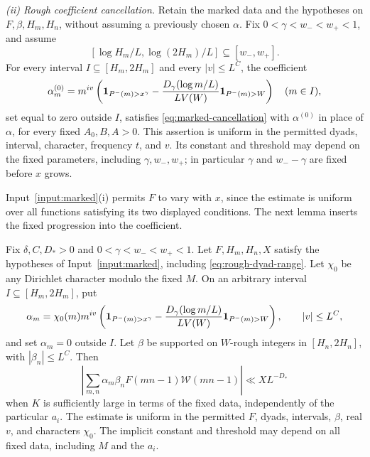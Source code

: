 \begin{hypothesis}
\emph{(ii) Rough coefficient cancellation.}
Retain the marked data and the hypotheses on \(F,\beta,H_m,H_n\), without
assuming a previously chosen \(\alpha\).  Fix \(0<\gamma<w_-<w_+<1\), and assume
\begin{equation}\label{eq:rough-dyad-range}
 [\log H_m/L,\log(2H_m)/L]\subseteq[w_-,w_+].
\end{equation}
For every interval \(I\subseteq[H_m,2H_m]\) and every \(|v|\le L^C\),
the coefficient
\begin{equation}\label{eq:untwisted-rough-coefficient}
 \alpha_m^{(0)}=m^{iv}\left(
   \mathbf 1_{P^-(m)>x^\gamma}
   -\frac{D_\gamma(\log m/L)}{LV(W)}\mathbf 1_{P^-(m)>W}\right)
 \quad(m\in I),
\end{equation}
set equal to zero outside \(I\), satisfies
\eqref{eq:marked-cancellation} with \(\alpha^{(0)}\) in place of
\(\alpha\), for every fixed \(A_0,B,A>0\).  This assertion is uniform in
the permitted dyads, interval, character, frequency \(t\), and \(v\).
Its constant and threshold may depend on the fixed parameters, including
\(\gamma,w_-,w_+\); in particular \(\gamma\) and \(w_--\gamma\) are
fixed before \(x\) grows.
\end{hypothesis}

Input~\ref{input:marked}(i) permits \(F\) to vary with \(x\), since the estimate is
uniform over all functions satisfying its two displayed conditions.
The next lemma inserts the fixed progression into the coefficient.

\begin{lemma}
\label{lem:twisted-rough-type-ii}
Fix \(\delta,C,D_*>0\) and \(0<\gamma<w_-<w_+<1\).  Let \(F,H_m,H_n,X\)
satisfy the hypotheses of Input~\ref{input:marked}, including
\eqref{eq:rough-dyad-range}.  Let \(\chi_0\) be any Dirichlet character
modulo the fixed \(M\).  On an arbitrary interval
\(I\subseteq[H_m,2H_m]\), put
\begin{equation}\label{eq:twisted-rough-coefficient}
 \alpha_m=\chi_0(m)m^{iv}\left(
   \mathbf 1_{P^-(m)>x^\gamma}
   -\frac{D_\gamma(\log m/L)}{LV(W)}\mathbf 1_{P^-(m)>W}\right),
 \qquad |v|\le L^C,
\end{equation}
and set \(\alpha_m=0\) outside \(I\).  Let \(\beta\) be supported on
\(W\)-rough integers in \([H_n,2H_n]\), with \(|\beta_n|\le L^C\).  Then
\begin{equation}\label{eq:twisted-rough-type-ii}
 \left|\sum_{m,n}\alpha_m\beta_nF(mn-1)\mathcal W(mn-1)\right|
      \ll XL^{-D_*}
\end{equation}
when \(K\) is sufficiently large in terms of the fixed data, independently
of the particular \(a_i\).  The estimate is uniform in the permitted
\(F\), dyads, intervals, \(\beta\), real \(v\), and characters \(\chi_0\).
The implicit constant and threshold may depend on all fixed data,
including \(M\) and the \(a_i\).
\end{lemma}


